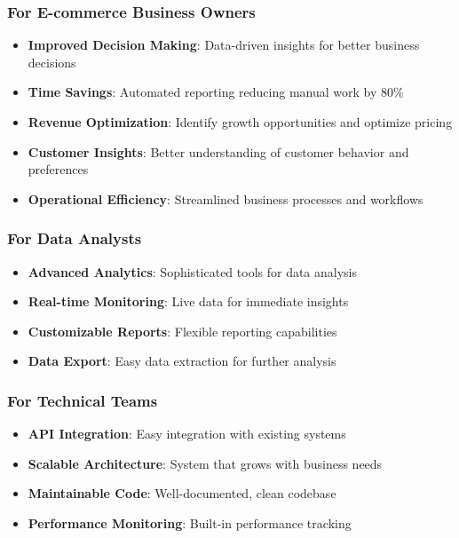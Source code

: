 \documentclass[12pt]{article}
\begin{document}
\subsubsection{For E-commerce Business Owners}
\begin{itemize}
    \item \textbf{Improved Decision Making}: Data-driven insights for better business decisions
    \item \textbf{Time Savings}: Automated reporting reducing manual work by 80\%
    \item \textbf{Revenue Optimization}: Identify growth opportunities and optimize pricing
    \item \textbf{Customer Insights}: Better understanding of customer behavior and preferences
    \item \textbf{Operational Efficiency}: Streamlined business processes and workflows
\end{itemize}

\subsubsection{For Data Analysts}
\begin{itemize}
    \item \textbf{Advanced Analytics}: Sophisticated tools for data analysis
    \item \textbf{Real-time Monitoring}: Live data for immediate insights
    \item \textbf{Customizable Reports}: Flexible reporting capabilities
    \item \textbf{Data Export}: Easy data extraction for further analysis
\end{itemize}

\subsubsection{For Technical Teams}
\begin{itemize}
    \item \textbf{API Integration}: Easy integration with existing systems
    \item \textbf{Scalable Architecture}: System that grows with business needs
    \item \textbf{Maintainable Code}: Well-documented, clean codebase
    \item \textbf{Performance Monitoring}: Built-in performance tracking
\end{itemize}
\end{document}

